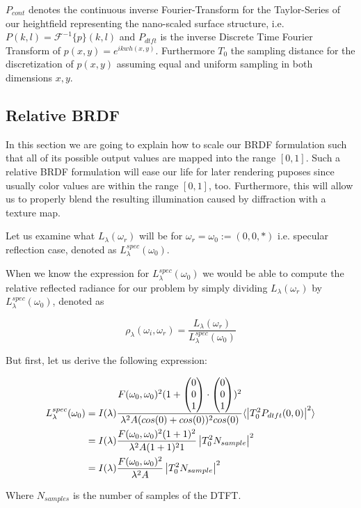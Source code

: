 $P_{cont}$ denotes the continuous inverse Fourier-Transform for the Taylor-Series of our heightfield representing the nano-scaled surface structure, i.e. $P(k,l) = \mathcal{F}^{-1}\{p\}(k,l)$ and $P_{dtft}$ is the inverse Discrete Time Fourier Transform of $p(x,y) = e^{ikwh(x,y)}$. Furthermore $T_0$ the sampling distance for the discretization of $p(x,y)$ assuming equal and uniform sampling in both dimensions $x,y$.

\subsection{Relative BRDF}
In this section we are going to explain how to scale our BRDF formulation such that all of its possible output values are mapped into the range $\left[0,1\right]$. Such a relative BRDF formulation will ease our life for later rendering puposes since usually color values are within the range $\left[0,1\right]$, too. Furthermore, this will allow us to properly blend the resulting illumination caused by diffraction with a texture map.

Let us examine what $L_\lambda(\omega_r)$ will be for $\omega_r = \omega_0 := (0,0,*)$ i.e. specular reflection case, denoted as $L_\lambda^{spec}(\omega_0)$. 

When we know the expression for $L_\lambda^{spec}(\omega_0)$ we would be able to compute the relative reflected radiance for our problem by simply dividing $L_\lambda(\omega_r)$ by $L_\lambda^{spec}(\omega_0)$, denoted as 

\begin{equation}
    \rho_\lambda(\omega_i,\omega_r) = \frac{L_\lambda(\omega_r)}{L_\lambda^{spec}(\omega_0)}
\end{equation}

But first, let us derive the following expression:

\begin{align*}
L_\lambda^{spec}(\omega_0) 
& = I(\lambda) \frac{F(\omega_0, \omega_0)^2 (1+\colvec[0]{0}{1}\cdot\colvec[0]{0}{1})^2}{\lambda^2 A (cos(0)+cos(0))^2 cos(0)} \langle \left|T_0^2 P_{dtft}(0,0)  \right|^2\rangle \\
& = I(\lambda) \frac{F(\omega_0, \omega_0)^2 (1+1)^2}{\lambda^2 A (1+1)^2 1}\left| T_0^2 N_{sample} \right|^2 \\
& = I(\lambda) \frac{F(\omega_0, \omega_0)^2}{\lambda^2 A}\left| T_0^2 N_{sample} \right|^2 
\end{align*}

Where $N_{samples}$ is the number of samples of the DTFT.

